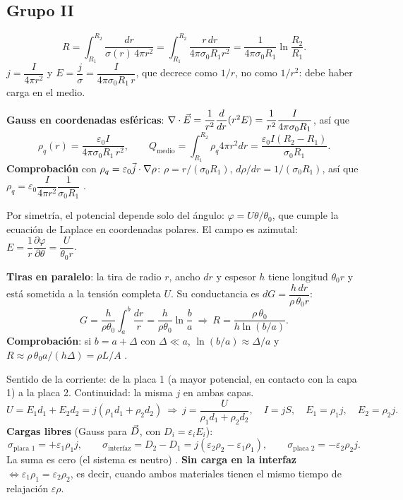 \subsection*{Grupo II}
\[
R=\int_{R_1}^{R_2}\frac{dr}{\sigma(r)\,4\pi r^2}=\int_{R_1}^{R_2}\frac{r\,dr}{4\pi\sigma_0R_1r^2}=\boxed{\frac{1}{4\pi\sigma_0R_1}\ln\frac{R_2}{R_1}}.
\]
$j=\dfrac{I}{4\pi r^2}$ y $E=\dfrac j\sigma=\boxed{\dfrac{I}{4\pi\sigma_0R_1\,r}}$, que decrece como $1/r$, no como $1/r^2$: debe haber carga en el medio.

\textbf{Gauss en coordenadas esféricas}: $\nabla\cdot\vec{E}=\dfrac1{r^2}\dfrac{d}{dr}(r^2E)=\dfrac1{r^2}\dfrac{I}{4\pi\sigma_0R_1}$, así que
\[
\rho_q(r)=\boxed{\frac{\varepsilon_0I}{4\pi\sigma_0R_1\,r^2}},\qquad Q_{\text{medio}}=\int_{R_1}^{R_2}\rho_q4\pi r^2dr=\boxed{\frac{\varepsilon_0I(R_2-R_1)}{\sigma_0R_1}}.
\]
\textbf{Comprobación} con $\rho_q=\varepsilon_0\vec{j}\cdot\nabla\rho$: $\rho=r/(\sigma_0R_1)$, $d\rho/dr=1/(\sigma_0R_1)$, así que $\rho_q=\varepsilon_0\dfrac{I}{4\pi r^2}\dfrac{1}{\sigma_0R_1}$ \checkmark.

Por simetría, el potencial depende solo del ángulo: $\varphi=U\theta/\theta_0$, que cumple la ecuación de Laplace en coordenadas polares. El campo es azimutal: $E=\dfrac1r\dfrac{\partial\varphi}{\partial\theta}=\dfrac{U}{\theta_0r}$.

\textbf{Tiras en paralelo}: la tira de radio $r$, ancho $dr$ y espesor $h$ tiene longitud $\theta_0r$ y está sometida a la tensión completa $U$. Su conductancia es $dG=\dfrac{h\,dr}{\rho\,\theta_0r}$:
\[
G=\frac{h}{\rho\theta_0}\int_a^b\frac{dr}{r}=\frac{h}{\rho\theta_0}\ln\frac ba\ \Rightarrow\ \boxed{R=\frac{\rho\,\theta_0}{h\ln(b/a)}}.
\]
\textbf{Comprobación}: si $b=a+\Delta$ con $\Delta\ll a$, $\ln(b/a)\approx\Delta/a$ y $R\approx\rho\,\theta_0a/(h\Delta)=\rho L/A$ \checkmark.

Sentido de la corriente: de la placa 1 (a mayor potencial, en contacto con la capa 1) a la placa 2. Continuidad: la misma $j$ en ambas capas.
\[
U=E_1d_1+E_2d_2=j(\rho_1d_1+\rho_2d_2)\ \Rightarrow\ \boxed{j=\frac{U}{\rho_1d_1+\rho_2d_2}},\quad I=jS,\quad E_1=\rho_1j,\quad E_2=\rho_2j.
\]
\textbf{Cargas libres} (Gauss para $\vec{D}$, con $D_i=\varepsilon_iE_i$):
\[
\sigma_{\text{placa 1}}=+\varepsilon_1\rho_1j,\qquad\sigma_{\text{interfaz}}=D_2-D_1=\boxed{j(\varepsilon_2\rho_2-\varepsilon_1\rho_1)},\qquad\sigma_{\text{placa 2}}=-\varepsilon_2\rho_2j.
\]
La suma es cero (el sistema es neutro) \checkmark. \textbf{Sin carga en la interfaz} $\iff\boxed{\varepsilon_1\rho_1=\varepsilon_2\rho_2}$, es decir, cuando ambos materiales tienen el mismo tiempo de relajación $\varepsilon\rho$.

